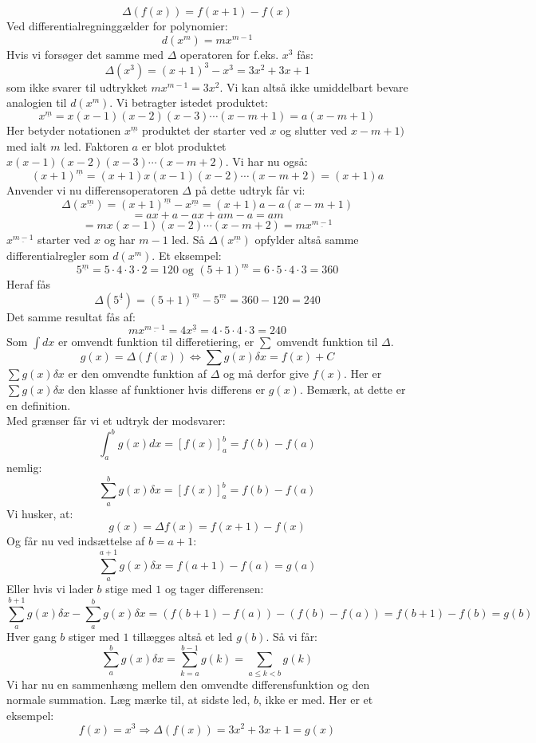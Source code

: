 \[\Delta(f(x))=f(x+1)-f(x)\]
Ved differentialregninggælder for polynomier:
\[d(x^{m})=mx^{m-1}\]
Hvis vi forsøger det samme med \(\Delta\) operatoren for f.eks. \(x^{3}\) fås:
\[\Delta(x^{3})=(x+1)^{3}-x^{3}=3x^{2}+3x+1\]
som ikke svarer til udtrykket \(mx^{m-1}=3x^{2}\). Vi kan altså ikke umiddelbart bevare analogien til \(d(x^{m})\). Vi betragter istedet produktet:
\[x^{\underline{m}}=x(x-1)(x-2)(x-3) \dotsm (x-m+1)=a(x-m+1)\]
Her betyder notationen \(x^{\underline{m}}\) produktet der starter ved \(x\) og slutter ved \(x-m+1)\) med ialt \(m\) led. Faktoren \(a\) er blot produktet \(x(x-1)(x-2)(x-3) \dotsm (x-m+2)\). Vi har nu også:
\[(x+1)^{\underline{m}}=(x+1)x(x-1)(x-2) \dotsm (x-m+2)=(x+1)a\]
Anvender vi nu differensoperatoren \(\Delta\) på dette udtryk får vi:
\[\Delta (x^{\underline{m}})=(x+1)^{\underline{m}}-x^{\underline{m}}=(x+1)a-a(x-m+1)\]
\[=ax+a-ax+am-a=am\]
\[=mx(x-1)(x-2) \dotsm (x-m+2)=mx^{\underline{m-1}}\]
\(x^{\underline{m-1}}\) starter ved \(x\) og har \(m-1\) led. Så \(\Delta(x^{\underline{m}})\) opfylder altså samme differentialregler som \(d(x^{m})\).
Et eksempel:
\[5^{\underline{m}}=5 \cdot 4 \cdot 3 \cdot 2=120 \text{ og } (5+1)^{\underline{m}}=6 \cdot 5 \cdot 4 \cdot 3=360\]
Heraf fås \[\Delta(5^{\underline{4}})=(5+1)^{\underline{m}}-5^{\underline{m}}=360-120=240\]
Det samme resultat fås af: 
\[mx^{\underline{m-1}}=4x^{\underline{3}}=4 \cdot 5 \cdot 4 \cdot 3 =240\]
Som \(\int dx\) er omvendt funktion til differetiering, er \(\sum\) omvendt funktion til \(\Delta\).
\[g(x)=\Delta (f(x)) \Leftrightarrow \sum g(x)\delta x = f(x)+C\]
\(\sum g(x)\delta x\) er den omvendte funktion af \(\Delta\) og må derfor give \(f(x)\). Her er \(\sum g(x)\delta x\) den klasse af funktioner hvis differens er \(g(x)\). Bemærk, at dette er en definition.\\
Med grænser får vi et udtryk der modsvarer:
\[\int_{a}^{b}g(x)dx=[f(x)]_{a}^{b}=f(b)-f(a)\]
nemlig:
\[\sum_{a}^{b}g(x)\delta x=[f(x)]_{a}^{b}=f(b)-f(a)\]
Vi husker, at:
\[g(x)=\Delta f(x)=f(x+1)-f(x)\]
Og får nu ved indsættelse af \(b=a+1\):
\[\sum_{a}^{a+1}g(x)\delta x=f(a+1)-f(a)=g(a)\]
Eller hvis vi lader \(b\) stige med \(1\) og tager differensen:
\[\sum_{a}^{b+1}g(x)\delta x-\sum_{a}^{b}g(x)\delta x=(f(b+1)-f(a))-(f(b)-f(a))=f(b+1)-f(b)=g(b)\]
Hver gang \(b\) stiger med \(1\) tillægges altså et led \(g(b)\). Så vi får:
\[\sum_{a}^{b}g(x)\delta x=\sum_{k=a}^{b-1}g(k)=\sum_{a \leq k<b}g(k)\]
Vi har nu en sammenhæng mellem den omvendte differensfunktion og den normale summation. Læg mærke til, at sidste led, \(b\), ikke er med.
Her er et eksempel:
\[f(x)=x^{3} \Rightarrow \Delta (f(x))=3x^{2}+3x+1=g(x)\]

